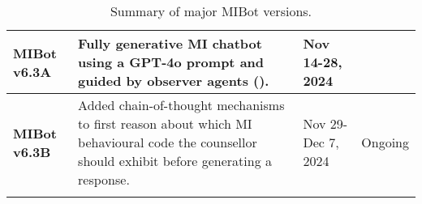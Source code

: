 \begin{table}[!ht]
\begin{tabularx}{\textwidth}{@{}>{\raggedright\arraybackslash}p{}YYY@{}}
		\hline
		\textbf{MIBot v6.3A} &
		Fully generative MI chatbot using a GPT-4o prompt and guided by observer agents ().
		                     & Nov 14-28, 2024                                                                                                                                                                                & \citet{mahmood-etal-2025-fully}                            \\
		\hline
		\textbf{MIBot v6.3B} & Added chain-of-thought mechanisms to first reason about which MI behavioural code the counsellor should exhibit before generating a response.                                                  & Nov 29-Dec 7, 2024              & Ongoing                  \\
		\bottomrule
        \end{tabularx}
        \endgroup
	\caption[Summary of major MIBot versions]{Summary of major MIBot versions.}
\end{table}